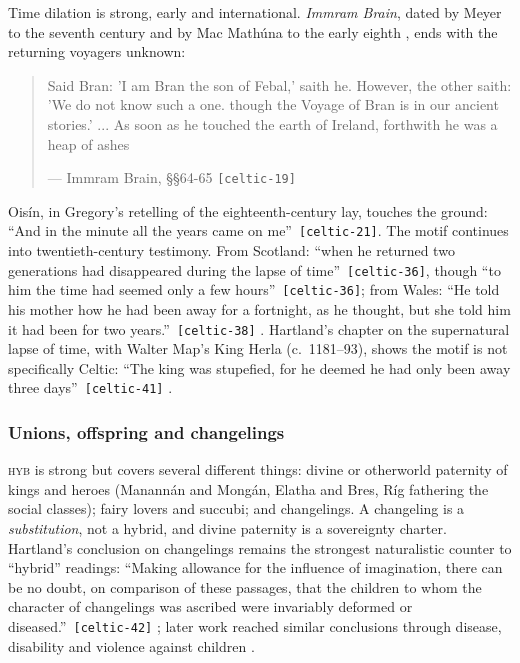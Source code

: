 \documentclass[11pt,a4paper]{article}
\newcommand{\pid}[1]{\texttt{\small #1}}
\begin{document}
Time dilation is strong, early and international. \emph{Immram Brain}, dated by Meyer to the seventh century and by Mac Mathúna to the early eighth \parencite{meyer1895,macmathuna1985}, ends with the returning voyagers unknown: 
\begin{quote}\small Said Bran: 'I am Bran the son of Febal,' saith he. However, the other saith: 'We do not know such a one. though the Voyage of Bran is in our ancient stories.' ... As soon as he touched the earth of Ireland, forthwith he was a heap of ashes\par\hfill{\footnotesize --- Immram Brain, §§64-65 \pid{[celtic-19]}}\end{quote}
 Oisín, in Gregory's retelling of the eighteenth-century lay, touches the ground: \enquote{And in the minute all the years came on me}~\pid{[celtic-21]}. The motif continues into twentieth-century testimony. From Scotland: \enquote{when he returned two generations had disappeared during the lapse of time}~\pid{[celtic-36]}, though \enquote{to him the time had seemed only a few hours}~\pid{[celtic-36]}; from Wales: \enquote{He told his mother how he had been away for a fortnight, as he thought, but she told him it had been for two years.}~\pid{[celtic-38]} \parencite{evanswentz1911}. Hartland's chapter on the supernatural lapse of time, with Walter Map's King Herla (c.~1181--93), shows the motif is not specifically Celtic: \enquote{The king was stupefied, for he deemed he had only been away three days}~\pid{[celtic-41]} \parencite{hartland1891,map1983}.

\subsubsection{Unions, offspring and changelings}

\textsc{hyb} is strong but covers several different things: divine or otherworld paternity of kings and heroes (Manannán and Mongán, Elatha and Bres, Ríg fathering the social classes); fairy lovers and succubi; and changelings. A changeling is a \emph{substitution}, not a hybrid, and divine paternity is a sovereignty charter. Hartland's conclusion on changelings remains the strongest naturalistic counter to ``hybrid'' readings: \enquote{Making allowance for the influence of imagination, there can be no doubt, on comparison of these passages, that the children to whom the character of changelings was ascribed were invariably deformed or diseased.}~\pid{[celtic-42]} \parencite{hartland1891}; later work reached similar conclusions through disease, disability and violence against children \parencite{eberly1988,bourke1999}.
\end{document}
